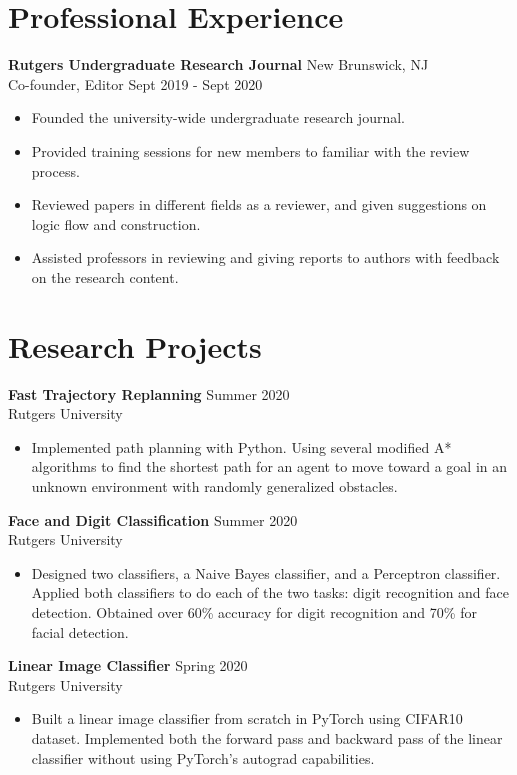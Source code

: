 \documentclass{article}
\begin{document}
\section{Professional Experience}
\textbf{Rutgers Undergraduate Research Journal}
\hfill{New Brunswick, NJ}\\
Co-founder, Editor
\hfill{Sept 2019 - Sept 2020}
\begin{itemize}
  \itemsep0em
  \item Founded the university-wide undergraduate research journal.
  \item Provided training sessions for new members to familiar with the review process.
  \item Reviewed papers in different fields as a reviewer, and given suggestions on logic flow and construction.
  \item Assisted professors in reviewing and giving reports to authors with feedback on the research content.
\end{itemize}


\section{Research Projects}
\textbf{Fast Trajectory Replanning}
\hfill{Summer 2020}\\
Rutgers University
\begin{itemize}
  \itemsep0em
  \item Implemented path planning with Python. Using several modified A* algorithms to find the shortest path for an agent to move toward a goal in an unknown environment with randomly generalized obstacles.
\end{itemize}

\noindent \textbf{Face and Digit Classification}
\hfill{Summer 2020}\\
Rutgers University
\begin{itemize}
  \itemsep0em
  \item Designed two classifiers, a Naive Bayes classifier, and a Perceptron classifier. Applied both classifiers to do each of the two tasks: digit recognition and face detection. Obtained over 60\% accuracy for digit recognition and 70\% for facial detection.
\end{itemize}

\noindent \textbf{Linear Image Classifier}
\hfill{Spring 2020}\\
Rutgers University
\begin{itemize}
  \itemsep0em
  \item Built a linear image classifier from scratch in PyTorch using CIFAR10 dataset. Implemented both the forward pass and backward pass of the linear classifier without using PyTorch's autograd capabilities.
\end{itemize}
\end{document}
